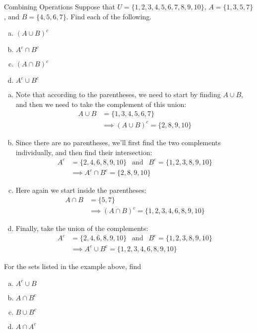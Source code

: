 \begin{example}[https://www.youtube.com/watch?v=PCEPxKrRaQE&list=PLfmpjsIzhztuvrh-T2Owgo_gO84qypSBG&index=16]{Combining Operations}
Suppose that $U = \{1,2,3,4,5,6,7,8,9,10\}$, $A=\{1,3,5,7\}$, and $B=\{4,5,6,7\}$.  Find each of the following.
\begin{enumerate}[(a)]
\item $(A \cup B)^c$
\item $A^c \cap B^c$
\item $(A \cap B)^c$
\item $A^c \cup B^c$
\end{enumerate}

\sol
\begin{enumerate}[(a)]
\item Note that according to the parentheses, we need to start by finding $A \cup B$, and then we need to take the complement of this union:
\begin{align*}
A \cup B &= \{1,3,4,5,6,7\}\\
&\implies \boxed{(A \cup B)^c = \{2,8,9,10\}}
\end{align*}

\item Since there are no parentheses, we'll first find the two complements individually, and then find their intersection:
\begin{align*}
A^c &= \{2,4,6,8,9,10\} \ \ \textrm{ and } \ \ B^c = \{1,2,3,8,9,10\}\\
&\implies \boxed{A^c \cap B^c = \{2,8,9,10\}}
\end{align*}

\item Here again we start inside the parentheses:
\begin{align*}
A \cap B &= \{5,7\}\\
&\implies \boxed{(A \cap B)^c = \{1,2,3,4,6,8,9,10\}}
\end{align*}

\item Finally, take the union of the complements:
\begin{align*}
A^c &= \{2,4,6,8,9,10\} \ \ \textrm{ and } \ \ B^c = \{1,2,3,8,9,10\}\\
&\implies \boxed{A^c \cup B^c = \{1,2,3,4,6,8,9,10\}}
\end{align*}
\end{enumerate}
\end{example}

\begin{try}
For the sets listed in the example above, find
\begin{enumerate}[(a)]
\item $A^c \cup B$
\item $A \cap B^c$
\item $B \cup B^c$
\item $A \cap A^c$
\end{enumerate}
\end{try}

